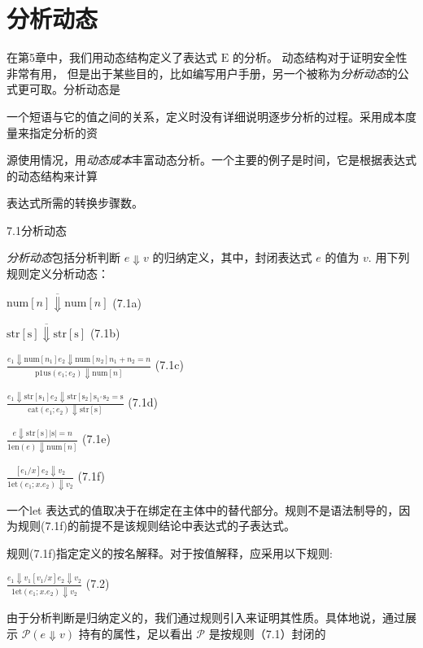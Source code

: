 \chapter{分析动态}


在第5章中，我们用动态结构定义了表达式 $\mathrm{E}$ 的分析。 动态结构对于证明安全性非常有用，
但是出于某些目的，比如编写用户手册，另一个被称为{\it 分析动态}的公式更可取。分析动态是

一个短语与它的值之间的关系，定义时没有详细说明逐步分析的过程。采用成本度量来指定分析的资

源使用情况，用{\it 动态成本}丰富动态分析。一个主要的例子是时间，它是根据表达式的动态结构来计算

表达式所需的转换步骤数。

7.1分析动态

{\it 分析动态}包括分析判断 $e\Downarrow v$ 的归纳定义，其中，封闭表达式 $e$ 的值为 $v$. 用下列规则定义分析动态：
\begin{center}
$\overline{\mathrm{n}\mathrm{u}\mathrm{m}[n]\Downarrow \mathrm{n}\mathrm{u}\mathrm{m}[n]}$   (7.1a)

$\overline{\mathrm{s}\mathrm{t}\mathrm{r}[\mathrm{s}]\Downarrow \mathrm{s}\mathrm{t}\mathrm{r}[\mathrm{s}]}$   (7.1b)

$\displaystyle \frac{e_{1}\Downarrow \mathrm{n}\mathrm{u}\mathrm{m}[n_{1}]e_{2}\Downarrow \mathrm{n}\mathrm{u}\mathrm{m}[n_{2}]n_{1}+n_{2}=n}{\mathrm{p}1\mathrm{u}\mathrm{s}(e_{1};e_{2})\Downarrow \mathrm{n}\mathrm{u}\mathrm{m}[n]}$   (7.1c)

$\displaystyle \frac{e_{1}\Downarrow \mathrm{s}\mathrm{t}\mathrm{r}[\mathrm{s}_{1}]e_{2}\Downarrow \mathrm{s}\mathrm{t}\mathrm{r}[\mathrm{s}_{2}]\mathrm{s}_{1^{\wedge}}\mathrm{s}_{2}=\mathrm{s}}{\mathrm{c}\mathrm{a}\mathrm{t}(e_{1};e_{2})\Downarrow \mathrm{s}\mathrm{t}\mathrm{r}[\mathrm{s}]}$   (7.1d)

$\displaystyle \frac{e\Downarrow \mathrm{s}\mathrm{t}\mathrm{r}[\mathrm{s}]|\mathrm{s}|=n}{1\mathrm{e}\mathrm{n}(e)\Downarrow \mathrm{n}\mathrm{u}\mathrm{m}[n]}$   (7.1e)

$\displaystyle \frac{[e_{1}/x]e_{2}\Downarrow v_{2}}{1\mathrm{e}\mathrm{t}(e_{1};x.e_{2})\Downarrow v_{2}}$   (7.1f)
\end{center}
一个let 表达式的值取决于在绑定在主体中的替代部分。规则不是语法制导的，因为规则(7.1f)的前提不是该规则结论中表达式的子表达式。

规则(7.1f)指定定义的按名解释。对于按值解释，应采用以下规则:

\begin{center}
$\displaystyle \frac{e_{1}\Downarrow v_{1}[v_{1}/x]e_{2}\Downarrow v_{2}}{1\mathrm{e}\mathrm{t}(e_{1};x.e_{2})\Downarrow v_{2}}$   (7.2)
\end{center}
由于分析判断是归纳定义的，我们通过规则引入来证明其性质。具体地说，通过展示 $\mathcal{P}(e\Downarrow v)$ 持有的属性，足以看出 $\mathcal{P}$ 是按规则（7.1）封闭的

